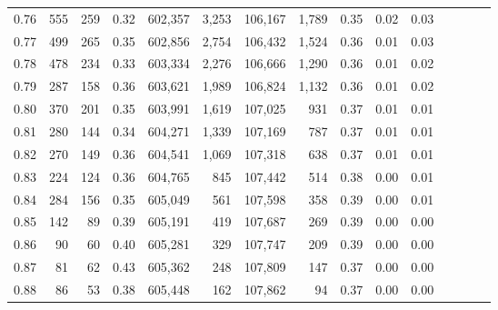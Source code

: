 \begin{tabular}{rrrcrrrrrrrrrrr}
0.76 &     555 &    259 &                                       0.32 &  602,357 &    3,253 &  106,167 &    1,789 &  0.35 &  0.02 &                         0.03 \\
0.77 &     499 &    265 &                                       0.35 &  602,856 &    2,754 &  106,432 &    1,524 &  0.36 &  0.01 &                         0.03 \\
0.78 &     478 &    234 &                                       0.33 &  603,334 &    2,276 &  106,666 &    1,290 &  0.36 &  0.01 &                         0.02 \\
0.79 &     287 &    158 &                                       0.36 &  603,621 &    1,989 &  106,824 &    1,132 &  0.36 &  0.01 &                         0.02 \\
0.80 &     370 &    201 &                                       0.35 &  603,991 &    1,619 &  107,025 &      931 &  0.37 &  0.01 &                         0.01 \\
0.81 &     280 &    144 &                                       0.34 &  604,271 &    1,339 &  107,169 &      787 &  0.37 &  0.01 &                         0.01 \\
0.82 &     270 &    149 &                                       0.36 &  604,541 &    1,069 &  107,318 &      638 &  0.37 &  0.01 &                         0.01 \\
0.83 &     224 &    124 &                                       0.36 &  604,765 &      845 &  107,442 &      514 &  0.38 &  0.00 &                         0.01 \\
0.84 &     284 &    156 &                                       0.35 &  605,049 &      561 &  107,598 &      358 &  0.39 &  0.00 &                         0.01 \\
0.85 &     142 &     89 &                                       0.39 &  605,191 &      419 &  107,687 &      269 &  0.39 &  0.00 &                         0.00 \\
0.86 &      90 &     60 &                                       0.40 &  605,281 &      329 &  107,747 &      209 &  0.39 &  0.00 &                         0.00 \\
0.87 &      81 &     62 &                                       0.43 &  605,362 &      248 &  107,809 &      147 &  0.37 &  0.00 &                         0.00 \\
0.88 &      86 &     53 &                                       0.38 &  605,448 &      162 &  107,862 &       94 &  0.37 &  0.00 &                         0.00 \\

\end{tabular}
